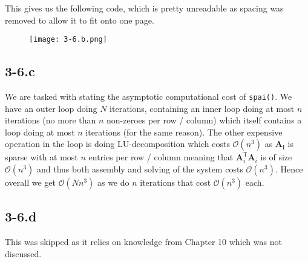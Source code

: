 \documentclass{article}
\begin{document}
\pagebreak

\noindent This gives us the following code, which is pretty unreadable as spacing was removed to allow it to fit onto one page.

\begin{figure}[!hbt]
    \centering
\texttt{[image: 3-6.b.png]}
\end{figure}
\subsection*{3-6.c}
We are tasked with stating the asymptotic computational cost of \verb|spai()|. We have an outer loop doing $N$ iterations, containing an inner loop doing at most $n$ iterations (no more than $n$ non-zeroes per row / column) which itself contains a loop doing at most $n$ iterations (for the same reason). The other expensive operation in the loop is doing LU-decomposition which costs $\mathcal{O}\left(n^{3}\right)$ as $\mathbf{A_{i}}$ is sparse with at most $n$ entries per row / column meaning that $\mathbf{A}_{i}^{\mathsf{T}}\mathbf{A}_{i}$ is of size $\mathcal{O}\left(n^{3}\right)$ and thus both assembly and solving of the system costs $\mathcal{O}\left(n^{3}\right)$. Hence overall we get $\mathcal{O}\left(Nn^{3}\right)$ as we do $n$ iterations that cost $\mathcal{O}\left(n^{3}\right)$ each.
\subsection*{3-6.d}
This was skipped as it relies on knowledge from Chapter 10 which was not discussed.
\end{document}
